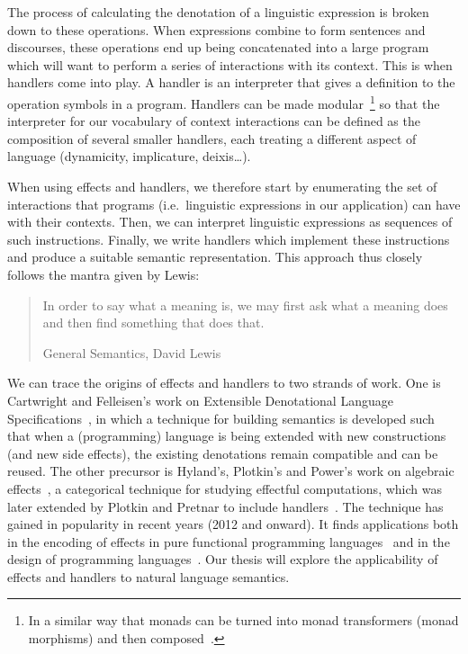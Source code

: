 The process of calculating the denotation of a linguistic expression is
broken down to these operations. When expressions combine to form sentences
and discourses, these operations end up being concatenated into a large
program which will want to perform a series of interactions with its
context. This is when handlers come into play. A handler is an interpreter
that gives a definition to the operation symbols in a program. Handlers can
be made modular~\footnote{In a similar way that monads can be turned into
  monad transformers (monad morphisms) and then
  composed~\cite{shan2002monads,wu2015transformers}.} so that the
interpreter for our vocabulary of context interactions can be defined as
the composition of several smaller handlers, each treating a different
aspect of language (dynamicity, implicature, deixis\ldots).

When using effects and handlers, we therefore start by enumerating the set
of interactions that programs (i.e.\ linguistic expressions in our
application) can have with their contexts. Then, we can interpret
linguistic expressions as sequences of such instructions. Finally, we write
handlers which implement these instructions and produce a suitable semantic
representation. This approach thus closely follows the mantra given by
Lewis:

\begin{quote}
  In order to say what a meaning is, we may first ask what a meaning does
  and then find something that does that.

  \begin{flushright}
    General Semantics, David Lewis~\cite{lewis1970general}
  \end{flushright}
\end{quote}

We can trace the origins of effects and handlers to two strands of
work. One is Cartwright and Felleisen's work on Extensible Denotational
Language Specifications~\cite{cartwright1994extensible}, in which a
technique for building semantics is developed such that when a
(programming) language is being extended with new constructions (and new
side effects), the existing denotations remain compatible and can be
reused. The other precursor is Hyland's, Plotkin's and Power's work on
algebraic effects~\cite{hyland2006combining}, a categorical technique for
studying effectful computations, which was later extended by Plotkin and
Pretnar to include
handlers~\cite{plotkin2009handlers,pretnar2010logic,plotkin2013handling}. The
technique has gained in popularity in recent years (2012 and onward). It
finds applications both in the encoding of effects in pure functional
programming
languages~\cite{kiselyov2013extensible,kiselyov2015freer,kammar2013handlers,brady2013programming}
and in the design of programming
languages~\cite{bauer2012programming,lindley2016dobedobedo,dolan2015effective,kiselyov2016eff,hillerstrom2016compiling}. Our
thesis will explore the applicability of effects and handlers to natural
language semantics.


